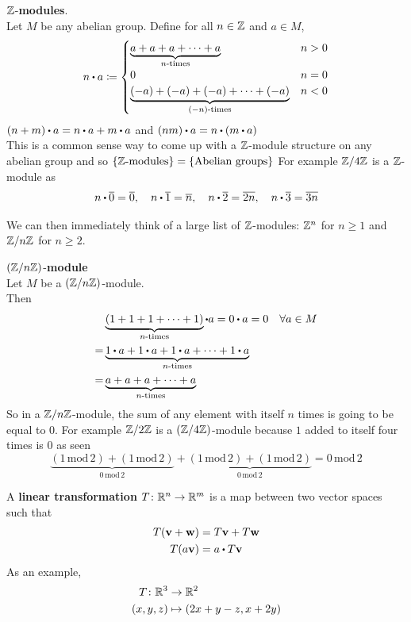 \documentclass[../Main.tex]{subfiles}
\begin{document}
\begin{example}
	$\mathbb{Z}$-\textbf{modules}.\\
	Let $M$ be any abelian group. Define for all $n\in \mathbb{Z}$ and $a\in M$,
	\[
	n\rdot a \coloneqq \begin{cases}
	\underbrace{a+a+a+\dots+a}_{n\text{-times}} & n> 0 \\
	0 & n = 0 \\
	\underbrace{(-a)+(-a)+(-a)+\dots+(-a)}_{(-n)\text{-times}} & n <0
	\end{cases}
	\]
	\Exr $(n+m)\rdot a=n\rdot a+m\rdot a$ and $(nm)\rdot a=n\rdot (m\rdot a)$\\
	This is a common sense way to come up with a $\mathbb{Z}$-module structure on any abelian group and
	so $\{\mathbb{Z}\text{-modules}\}= \{\text{Abelian groups}\}$ For example $\mathbb{Z}/4\mathbb{Z}$ is a $\mathbb{Z}$-module as
	\[n\rdot \obar{0}=\obar{0},\quad n\rdot \obar{1}=\obar{n},\quad n\rdot \obar{2}=\obar{2n},\quad n\rdot \obar{3}=\obar{3n}\]
\end{example}
We can then immediately think of a large list of $\mathbb{Z}$-modules: $\mathbb{Z}^n$ for $n\ge 1$ and $\mathbb{Z}/n\mathbb{Z}$ for $n\ge 2$.
\begin{example}
	$(\mathbb{Z}/n\mathbb{Z})$-\textbf{module}\\
	Let $M$ be a $(\mathbb{Z}/n\mathbb{Z})$-module. \\
	Then 
	\begin{align*}
	&\underbrace{(1+1+1+\dots+1)}_{n\text{-times}}\rdot a = 0\rdot a = 0 \quad \forall a \in M\\
	=&\underbrace{1\rdot a+1\rdot a+1\rdot a+\dots+1\rdot a}_{n\text{-times}}\\
	=&\underbrace{a+a+a+\dots+a}_{n\text{-times}}
	\end{align*}
	So in a $\mathbb{Z}/n\mathbb{Z}$-module, the sum of any element with itself $n$ times is going to be equal to 0.
	For example $\mathbb{Z}/2\mathbb{Z}$ is a $(\mathbb{Z}/4\mathbb{Z})$-module because $1$ added to itself four times is $0$ as seen
	\[\underbrace{(1\,\mathrm{mod}\,2) + (1\,\mathrm{mod}\,2)}_{0\,\mathrm{mod}\,2} + \underbrace{(1\,\mathrm{mod}\,2)+ (1\,\mathrm{mod}\,2)}_{0 \,\mathrm{mod}\,2} = 0\,\mathrm{mod}\,2\]
\end{example}
A \textbf{linear transformation}  $T\colon \mathbb{R}^n \to \mathbb{R}^m$ is a map between two vector spaces such that
\begin{align*}
T(\vv+\vw)&=T\vv+T\vw\\
T(a\vv)&=a\rdot T\vv
\end{align*}
As an example,
\begin{align*}
T\colon \mathbb{R}^3&\to \mathbb{R}^2 \\
(x,y,z)&\mapsto (2x+y-z,x+2y)
\end{align*}
\end{document}
